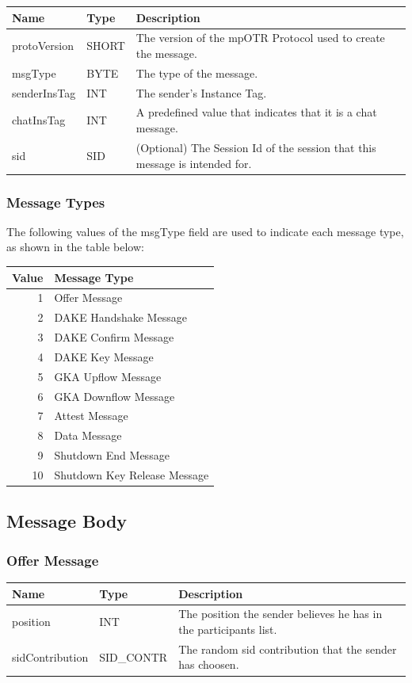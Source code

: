 \documentclass[12pt,titlepage,a4paper]{article}
\begin{document}
\begin{tabular}{l l l}
Name         & Type  & Description \\
\hline
protoVersion & SHORT & The version of the mpOTR Protocol used to create the message. \\
msgType      & BYTE  & The type of the message. \\
senderInsTag & INT   & The sender's Instance Tag. \\
chatInsTag   & INT   & A predefined value that indicates that it is a chat message. \\
sid          & SID   & (Optional) The Session Id of the session that this message is intended for. \\
\end{tabular}

\subsubsection{Message Types}
The following values of the msgType field are used to indicate each message type, as shown in the table below:

\begin{tabular}{r l}
Value & Message Type \\
\hline
1 & Offer Message \\
2 & DAKE Handshake Message \\
3 & DAKE Confirm Message \\
4 & DAKE Key Message \\
5 & GKA Upflow Message \\
6 & GKA Downflow Message \\
7 & Attest Message \\
8 & Data Message \\
9 & Shutdown End Message \\
10 & Shutdown Key Release Message \\
\end{tabular}

\subsection{Message Body}

\subsubsection{Offer Message}
\begin{tabular}{l l l}
Name            & Type       & Description \\
\hline
position        & INT        & The position the sender believes he has in the participants list. \\
sidContribution & SID\_CONTR & The random sid contribution that the sender has choosen. \\
\end{tabular}
\end{document}
